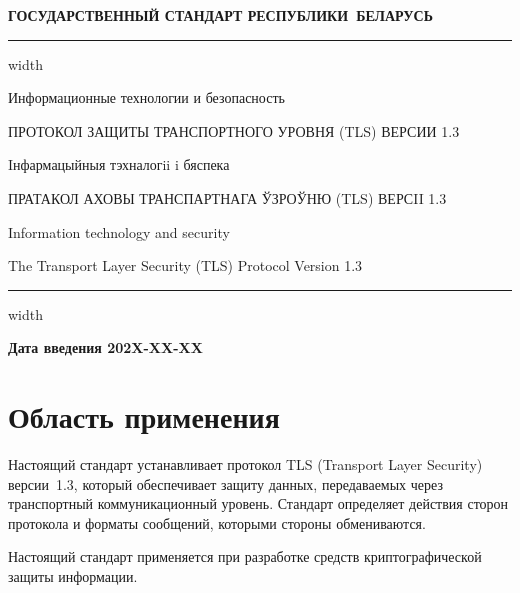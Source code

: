 \newpage
\setcounter{page}{1}
\pagestyle{headings}


\begin{center}
{\bfseries
ГОСУДАРСТВЕННЫЙ СТАНДАРТ РЕСПУБЛИКИ~БЕЛАРУСЬ
\vskip 2pt
\hrule width\textwidth

\vskip 9pt

Информационные технологии и безопасность

ПРОТОКОЛ ЗАЩИТЫ ТРАНСПОРТНОГО УРОВНЯ (TLS) ВЕРСИИ 1.3


\vskip 9pt

Iнфармацыйныя тэхналогii i бяспека

ПРАТАКОЛ АХОВЫ ТРАНСПАРТНАГА ЎЗРОЎНЮ (TLS) ВЕРСII 1.3

} %

\vskip 9pt

Information technology and security

The Transport Layer Security (TLS) Protocol Version 1.3

\vskip 4pt                
\hrule width \textwidth
\end{center}

\mbox{}\hfill{\bfseries Дата введения 202X-XX-XX}

\chapter{Область применения}

Настоящий стандарт устанавливает протокол TLS (Transport Layer Security)
версии~1.3, который обеспечивает защиту данных, передаваемых через
транспортный коммуникационный уровень. Стандарт определяет действия сторон
протокола и форматы сообщений, которыми стороны обмениваются.

Настоящий стандарт применяется при разработке средств криптографической защиты  
информации.

